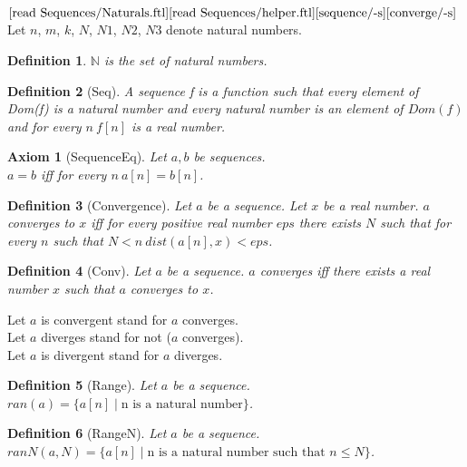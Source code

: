 \documentclass{article}
\newenvironment{forthel}{\begin{leftbar}}{\end{leftbar}}
\newtheorem{axiom}{Axiom}
\newtheorem{definition}{Definition}
\newcommand{\NN}{\mathbb{N}}
\begin{document}
\begin{forthel}
	\noindent $\text{[read Sequences/Naturals.ftl]}\\
	\text{[read Sequences/helper.ftl]}\\
	\text{[sequence/-s]}\\
	\text{[converge/-s]}$\\
	Let $n$, $m$, $k$, $N$, $N1$, $N2$, $N3$ denote natural numbers.
	
	\begin{definition}
		$\NN$ is the set of natural numbers.
	\end{definition}
	
	\begin{definition}[Seq]	A sequence f is a function such that every element of Dom(f) is a natural number and every
	natural number is an element of $Dom(f)$ and for every $n \ f[n]$ is a real number.
	\end{definition}
	
	\begin{axiom}[SequenceEq] Let $a, b$ be sequences. \\ $a = b$ iff for every $n \ a[n] = b[n]$.
	\end{axiom}
	
	\begin{definition}[Convergence] Let $a$ be a sequence. Let $x$ be a real number. $a$ converges to $x$ iff for every positive real
	number $eps$ there exists $N$ such that for every $n$ such that $N < n \ dist(a[n],x) < eps$.
	\end{definition}
	
	\begin{definition}[Conv] Let $a$ be a sequence. $a$ converges iff there exists a real number $x$ such that $a$ converges to $x$.
	\end{definition}
	
	\noindent Let $a$ is convergent stand for $a$ converges.
	\\Let $a$ diverges stand for not ($a$ converges).
	\\Let $a$ is divergent stand for $a$ diverges.
	
	\begin{definition}[Range] Let $a$ be a sequence. \\ $ran(a) = \{a[n] \mid \text{n is a natural number} \}$. 
	\end{definition}

	\begin{definition}[RangeN] Let $a$ be a sequence. \\ $ranN(a,N) = \{a[n] \mid \text{n is a natural number such that } n \leq N\}$. 
	\end{definition}
	

\end{forthel}
\end{document}
